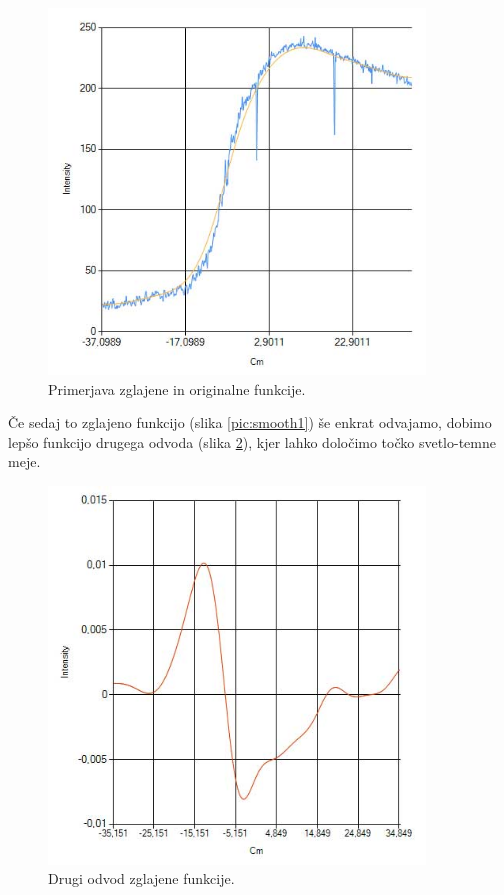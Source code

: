 \documentclass[oneside, a4paper, 12pt]{book}
\begin{document}
\begin{figure}
\begin{center}
\includegraphics[width=10cm]{slike/glajena-+-original.jpg}
\end{center}
\caption{Primerjava zglajene in originalne funkcije.}
\label{pic:smooth2}
\end{figure}

Če sedaj to zglajeno funkcijo (slika \ref{pic:smooth1}) še enkrat odvajamo, dobimo lepšo funkcijo drugega odvoda (slika \ref{pic:d22}), kjer lahko določimo točko svetlo-temne meje.

\begin{figure}
\begin{center}
\includegraphics[width=10cm]{slike/drugi-odvod-2.jpg}
\end{center}
\caption{Drugi odvod zglajene funkcije.}
\label{pic:d22}
\end{figure}
\end{document}
